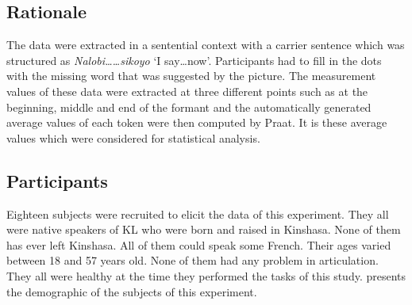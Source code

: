 \documentclass[output=paper]{langscibook}
\begin{document}
\subsection{Rationale}
The data were extracted in a sentential context with a carrier sentence which was structured as \textit{Nalobi……sikoyo} ‘I say…now’. Participants had to fill in the dots with the missing word that was suggested by the picture. The measurement values of these data were extracted at three different points such as at the beginning, middle and end of the formant and the automatically generated average values of each token were then computed by Praat. It is these average values which were considered for statistical analysis.

\subsection{Participants}
Eighteen subjects were recruited to elicit the data of this experiment. They all were native speakers of KL who were born and raised in Kinshasa. None of them has ever left Kinshasa. All of them could speak some French. Their ages varied between 18 and 57 years old. None of them had any problem in articulation. They all were healthy at the time they performed the tasks of this study.  presents the demographic of the subjects of this experiment.

\begin{table}
    \caption{The demographics of the subjects\label{tab:subjects}}
\end{table}
\end{document}
